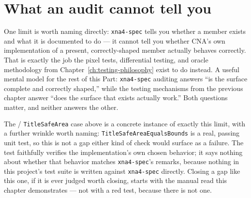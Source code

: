\section{What an audit cannot tell you}

One limit is worth naming directly: \texttt{xna4-spec} tells you whether a member exists and
what it is documented to do --- it cannot tell you whether CNA's own implementation of a
present, correctly-shaped member actually behaves correctly. That is exactly the job the
pixel tests, differential testing, and oracle methodology from
Chapter~\ref{ch:testing-philosophy} exist to do instead. A useful mental model for the rest of
this Part: \texttt{xna4-spec} auditing answers ``is the surface complete and correctly
shaped,'' while the testing mechanisms from the previous chapter answer ``does the surface
that exists actually work.'' Both questions matter, and neither answers the other.

The  / \texttt{TitleSafeArea} case above is a concrete instance of exactly
this limit, with a further wrinkle worth naming: \texttt{TitleSafeAreaEqualsBounds} is a real,
passing unit test, so this is not a gap either kind of check would surface as a failure. The
test faithfully verifies the implementation's own chosen behavior; it says nothing about
whether that behavior matches \texttt{xna4-spec}'s remarks, because nothing in this project's
test suite is written against \texttt{xna4-spec} directly. Closing a gap like this one, if it
is ever judged worth closing, starts with the manual read this chapter demonstrates --- not
with a red test, because there is not one.
